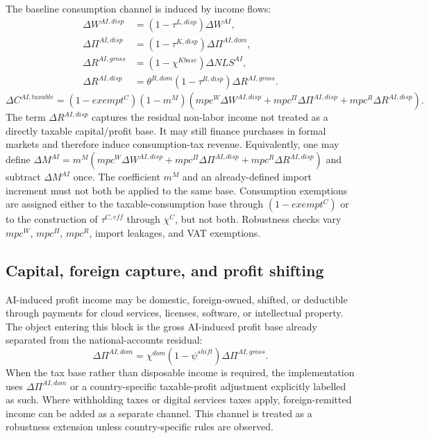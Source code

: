 \documentclass[11pt,a4paper]{article}
\begin{document}
The baseline consumption channel is induced by income flows:
\begin{equation}
\begin{split}
    \Delta W^{AI,disp}&=(1-\tau^{L,disp})\Delta W^{AI},\\
    \Delta\Pi^{AI,disp}&=(1-\tau^{K,disp})\Delta\Pi^{AI,dom},\\
    \Delta R^{AI,gross}&=(1-\chi^{Kbase})\Delta NLS^{AI},\\
    \Delta R^{AI,disp}&=\theta^{R,dom}(1-\tau^{R,disp})\Delta R^{AI,gross}.
\end{split}
\end{equation}
\begin{equation}
    \Delta C^{AI,taxable}=(1-exempt^C)(1-m^M)\left(mpc^W\Delta W^{AI,disp}+mpc^\Pi\Delta\Pi^{AI,disp}+mpc^R\Delta R^{AI,disp}\right).
\end{equation}
The term $\Delta R^{AI,disp}$ captures the residual non-labor income not treated as a directly taxable capital/profit base. It may still finance purchases in formal markets and therefore induce consumption-tax revenue. Equivalently, one may define $\Delta M^{AI}=m^M(mpc^W\Delta W^{AI,disp}+mpc^\Pi\Delta\Pi^{AI,disp}+mpc^R\Delta R^{AI,disp})$ and subtract $\Delta M^{AI}$ once. The coefficient $m^M$ and an already-defined import increment must not both be applied to the same base. Consumption exemptions are assigned either to the taxable-consumption base through $(1-exempt^C)$ or to the construction of $\tau^{C,eff}$ through $\chi^C$, but not both. Robustness checks vary $mpc^W$, $mpc^\Pi$, $mpc^R$, import leakages, and VAT exemptions.

\subsection{Capital, foreign capture, and profit shifting}

AI-induced profit income may be domestic, foreign-owned, shifted, or deductible through payments for cloud services, licenses, software, or intellectual property. The object entering this block is the gross AI-induced profit base already separated from the national-accounts residual:
\begin{equation}
    \Delta \Pi^{AI,dom}=\chi^{dom}(1-\psi^{shift})\Delta \Pi^{AI,gross}.
\end{equation}
When the tax base rather than disposable income is required, the implementation uses $\Delta \Pi^{AI,dom}$ or a country-specific taxable-profit adjustment explicitly labelled as such.
Where withholding taxes or digital services taxes apply, foreign-remitted income can be added as a separate channel. This channel is treated as a robustness extension unless country-specific rules are observed.
\end{document}
